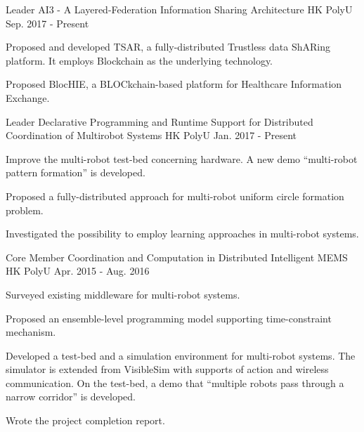 \documentclass[11pt, a4paper]{awesome-cv} %
\begin{document}
\begin{cventries}
\cventry
{Leader} %
{AI3 - A Layered-Federation Information Sharing Architecture} %
{HK PolyU} %
{Sep. 2017 - Present} %
{ %
\begin{cvitems}
\item {Proposed and developed TSAR, a fully-distributed Trustless data ShARing platform. It employs Blockchain as the underlying technology.}
\item {Proposed BlocHIE, a BLOCkchain-based platform for Healthcare Information Exchange.}
\end{cvitems}
}

\cventry
{Leader} %
{Declarative Programming and Runtime Support for Distributed Coordination of Multirobot Systems} %
{HK PolyU} %
{Jan. 2017 - Present} %
{ %
\begin{cvitems}
\item {Improve the multi-robot test-bed concerning hardware. A new demo ``multi-robot pattern formation'' is developed.}
\item {Proposed a fully-distributed approach for multi-robot uniform circle formation problem.}
\item {Investigated the possibility to employ learning approaches in multi-robot systems.}
\end{cvitems}
}

\cventry
{Core Member} %
{Coordination and Computation in Distributed Intelligent MEMS} %
{HK PolyU} %
{Apr. 2015 - Aug. 2016} %
{ %
\begin{cvitems}
\item {Surveyed existing middleware for multi-robot systems.}
\item {Proposed an ensemble-level programming model supporting time-constraint mechanism.}
\item {Developed a test-bed and a simulation environment for multi-robot systems. The simulator is extended from VisibleSim with supports of action and wireless communication. On the test-bed, a demo that ``multiple robots pass through a narrow corridor'' is developed.}
\item {Wrote the project completion report.}
\end{cvitems}
}
\end{cventries}
\end{document}
